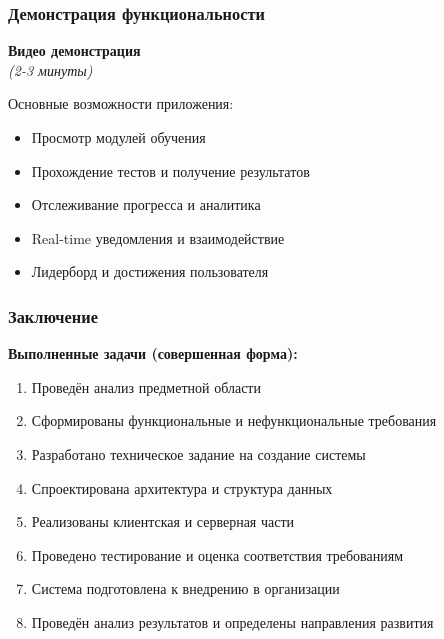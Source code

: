 \documentclass[aspectratio=43,11pt]{beamer}
\begin{document}
\begin{frame}
    \frametitle{Демонстрация функциональности}
    
    \centering
    
    \Large \textbf{Видео демонстрация} \\[2em]
    
    {\small \textit{(2-3 минуты)}} \\[1em]
    
    \normalsize
    
    Основные возможности приложения:
    \begin{itemize}
        \item Просмотр модулей обучения
        \item Прохождение тестов и получение результатов
        \item Отслеживание прогресса и аналитика
        \item Real-time уведомления и взаимодействие
        \item Лидерборд и достижения пользователя
    \end{itemize}
\end{frame}

\begin{frame}
    \frametitle{Заключение}
    
    \textbf{Выполненные задачи (совершенная форма):}
    
    \begin{enumerate}[label=\arabic*.]
        \item Проведён анализ предметной области
        
        \item Сформированы функциональные и нефункциональные требования
        
        \item Разработано техническое задание на создание системы
        
        \item Спроектирована архитектура и структура данных
        
        \item Реализованы клиентская и серверная части
        
        \item Проведено тестирование и оценка соответствия требованиям
        
        \item Система подготовлена к внедрению в организации
        
        \item Проведён анализ результатов и определены направления развития
    \end{enumerate}
\end{frame}
\end{document}
